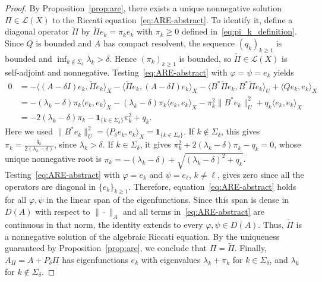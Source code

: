 \documentclass[11pt]{article}
\numberwithin{equation}{section}
\theoremstyle{definition}
\begin{document}
\begin{proof}
    By Proposition~\ref{prop:are}, there exists a unique nonnegative solution $\Pi \in \mathcal{L}(X)$ to the Riccati equation~\eqref{eq:ARE-abstract}.
    To identify it, define a diagonal operator $\widetilde\Pi$ by $\widetilde\Pi e_k = \pi_k e_k$ with $\pi_k \ge 0$ defined in~\eqref{eq:pi_k_definition}.
    Since $Q$ is bounded and $A$ has compact resolvent, the sequence $(q_k)_{k \ge 1}$ is bounded and $\inf_{k \notin \Sigma_\delta} \lambda_k > \delta$.
    Hence $(\pi_k)_{k \ge 1}$ is bounded, so $\widetilde{\Pi} \in \mathcal{L}(X)$ is self-adjoint and nonnegative.
    Testing~\eqref{eq:ARE-abstract} with $\varphi = \psi = e_k$ yields
    \begin{align*}
        0 &= -\langle (A-\delta I)e_k,\widetilde\Pi e_k\rangle_X - \langle \widetilde\Pi e_k, (A-\delta I)e_k \rangle_X - \langle B^*\widetilde\Pi e_k,B^*\widetilde\Pi e_k \rangle_U + \langle Qe_k, e_k\rangle_X \\
        &= -(\lambda_k-\delta)\pi_k\langle e_k,e_k \rangle_X - (\lambda_k-\delta)\pi_k\langle e_k,e_k\rangle_X - \pi_k^2\|B^* e_k\|_U^2 + q_k\langle e_k,e_k\rangle_X \\
        &= -2(\lambda_k-\delta)\pi_k -\mathbf{1}_{\{k \in \Sigma_\delta\}}\pi_k^2
        + q_k.
    \end{align*}
    Here we used $\|B^*e_k\|_U^2 = \langle P_\delta e_k, e_k\rangle_X =\mathbf{1}_{\{k\in\Sigma_\delta\}}$.
    If $k \notin \Sigma_\delta$, this gives $\pi_k = \frac{q_k}{2(\lambda_k-\delta)}$, since $\lambda_k > \delta$.
    If $k \in \Sigma_\delta$, it gives $\pi_k^2 + 2(\lambda_k - \delta)\pi_k - q_k = 0$, whose unique nonnegative root is $\pi_k = -(\lambda_k - \delta) + \sqrt{(\lambda_k - \delta)^2 + q_k}$.
    Testing~\eqref{eq:ARE-abstract} with $\varphi = e_k$ and $\psi = e_\ell$, $k \neq \ell$, gives zero since all the operators are diagonal in $\{e_k\}_{k \ge 1}$.
    Therefore, equation~\eqref{eq:ARE-abstract} holds for all $\varphi, \psi$ in the linear span of the eigenfunctions. 
    Since this span is dense in $D(A)$ with respect to $\|\cdot\|_A$ and all terms in~\eqref{eq:ARE-abstract} are continuous in that norm, the identity extends to every $\varphi, \psi \in D(A)$. 
    Thus, $\widetilde\Pi$ is a nonnegative solution of the algebraic Riccati equation.
    By the uniqueness guaranteed by Proposition~\ref{prop:are}, we conclude that $\Pi = \widetilde\Pi$.
    Finally, $A_\Pi = A + P_\delta\Pi$ has eigenfunctions $e_k$ with eigenvalues $\lambda_k + \pi_k$ for $k \in \Sigma_\delta$, and $\lambda_k$ for $k \notin \Sigma_\delta$.
\end{proof}
\end{document}
